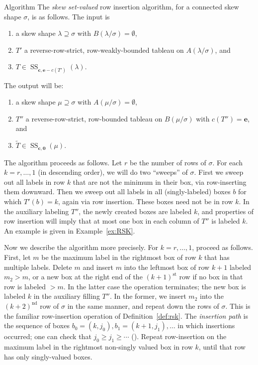 \documentclass[ALCO,ThmDefs,Unicode,epreuves]{cedram}
\DeclareMathOperator{\Semi}{SS}
\newcommand{\bfc}{\mathbf{c}}
\newcommand{\bfe}{\mathbf{e}}
\newcommand{\bfzr}{\mathbf{0}}
\newcommand{\wt}{\widetilde}
\begin{document}
\begin{enonce}{Algorithm}\label{algorithm}
The \emph{skew set-valued} row insertion algorithm, for a connected skew shape $\sigma$, is as follows. The input is

\begin{enumerate}
\item\label{algo3.12_1_1} a skew shape $\lambda \supseteq \sigma$ with $B(\lambda/\sigma)=\emptyset$,
\item\label{algo3.12_1_2} $T'$ a reverse-row-strict, row-weakly-bounded tableau on $A(\lambda/\sigma)$, and
\item\label{algo3.12_1_3} $T\in \Semi_{\bfc,\bfe-c(T')}(\lambda)$.
\end{enumerate}

The output will be:
\begin{enumerate}
\item\label{algo3.12_2_1} a skew shape $\mu\supseteq \sigma$ with $A(\mu/\sigma)=\emptyset$,
\item\label{algo3.12_2_2} $T''$ a reverse-row-strict, row-bounded tableau on $B(\mu/\sigma)$ with $c(T'')=\bfe$, and
\item\label{algo3.12_2_3} $\wt{T} \in \Semi_{\bfc,\bfzr}(\mu)$.
\end{enumerate}
\end{enonce}

The algorithm proceeds as follows. Let $r$ be the number of rows of $\sigma$. For each $k=r,\ldots,1$ (in descending order), we will do two ``sweeps'' of $\sigma$. First we sweep out all labels in row $k$ that are not the minimum in their box, via row-inserting them downward. Then we sweep out all labels in all (singly-labeled) boxes $b$ for which $T'(b) = k$, again via row insertion. These boxes need not be in row $k$. In the auxiliary labeling $T''$, the newly created boxes are labeled $k$, and properties of row insertion will imply that at most one box in each column of $T''$ is labeled $k$. An example is given in Example~\ref{ex:RSK}. 

Now we describe the algorithm more precisely. For $k=r,\ldots,1$, proceed as follows. First, let $m$ be the maximum label in the rightmost box of row $k$ that has multiple labels. Delete $m$ and insert $m$ into the leftmost box of row $k+1$ labeled $m_2>m$, or a new box at the right end of the $(k+1)^\text{st}$ row if no box in that row is labeled $>m$. In the latter case the operation terminates; the new box is labeled $k$ in the auxiliary filling $T''$. In the former, we insert $m_2$ into the $(k+2)^\text{nd}$ row of $\sigma$ in the same manner, and repeat down the rows of $\sigma$. This is the familiar row-insertion operation of Definition~\ref{def:rsk}. The \emph{insertion path} is the sequence of boxes $b_0 = (k,j_0),b_1=(k\!+\!1,j_1),\ldots$ in which insertions occurred; one can check that $j_0 \ge j_1 \ge \cdots$ (\cite[Lemma~7.11.2]{ec2}). Repeat row-insertion on the maximum label in the rightmost non-singly valued box in row $k$, until that row has only singly-valued boxes. 
\end{document}
